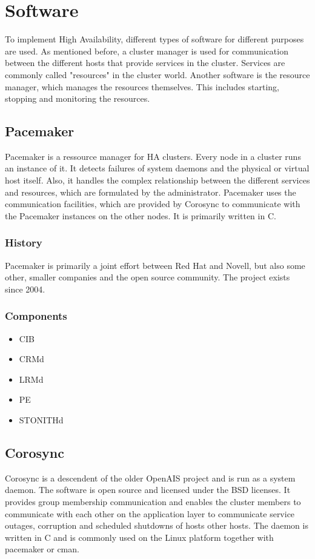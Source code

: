 \section{Software}
To implement High Availability, different types of software for different purposes are used.
As mentioned before, a cluster manager is used for communication between the different hosts that
provide services in the cluster. Services are commonly called "resources" in the cluster world.
Another software is the resource manager, which manages the resources themselves.
This includes starting, stopping and monitoring the resources.
\subsection{Pacemaker}
Pacemaker is a ressource manager for \ac{HA} clusters. Every node in a cluster
runs an instance of it. It detects failures of system daemons and the physical or
virtual host itself. Also, it handles the complex relationship between the different
services and resources, which are formulated by the administrator.
Pacemaker uses the communication facilities, which are provided by Corosync
to communicate with the Pacemaker instances on the other nodes. It is primarily written in C.
\subsubsection{History}
Pacemaker is primarily a joint effort between Red Hat and Novell, but also
some other, smaller companies and the open source community. The project
exists since 2004.
\subsubsection{Components}
\begin{itemize}
\item \ac{CIB}
\item \ac{CRMd}
\item \ac{LRMd}
\item \ac{PE}
\item \ac{STONITHd}
\end{itemize}
\subsection{Corosync}
Corosync is a descendent of the older OpenAIS project and is run as a system daemon. The software is open source and licensed under the BSD licenses. It provides group membership communication and enables the cluster members to communicate with each other on the application layer to communicate service outages, corruption and scheduled shutdowns of hosts other hosts. The daemon is written in C and is commonly used on the Linux platform together with pacemaker or cman.

